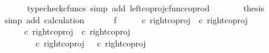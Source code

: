 \begin{isabellebody}
\ \isamarkupfalse%
\ {\isachardoublequoteopen}{\isachardot}{\kern0pt}{\isachardot}{\kern0pt}{\isachardot}{\kern0pt}\ {\isacharequal}{\kern0pt}\ {\isasymlangle}{\isasymt}{\isacharcomma}{\kern0pt}{\isasymf}{\isasymrangle}{\isachardoublequoteclose}\isanewline
\ \ \ \ \ \ \isamarkupfalse%
\ {\isacharparenleft}{\kern0pt}typecheck{\isacharunderscore}{\kern0pt}cfuncs{\isacharcomma}{\kern0pt}\ simp\ add{\isacharcolon}{\kern0pt}\ left{\isacharunderscore}{\kern0pt}coproj{\isacharunderscore}{\kern0pt}cfunc{\isacharunderscore}{\kern0pt}coprod{\isacharparenright}{\kern0pt}\isanewline
\ \ \ \ \isamarkupfalse%
\ \isamarkupfalse%
\ {\isacharquery}{\kern0pt}thesis\isanewline
\ \ \ \ \ \ \isamarkupfalse%
\ {\isacharparenleft}{\kern0pt}simp\ add{\isacharcolon}{\kern0pt}\ calculation{\isacharparenright}{\kern0pt}\isanewline
\ \ \isamarkupfalse%
\isanewline
\ \ \isamarkupfalse%
\ f{}{\isacharcolon}{\kern0pt}\ {\isachardoublequoteopen}{\isasymlangle}{\isasymt}{\isacharcomma}{\kern0pt}{\isasymt}{\isasymrangle}\ {\isasymamalg}\ {\isasymlangle}{\isasymt}{\isacharcomma}{\kern0pt}{\isasymf}{\isasymrangle}\ {\isasymamalg}\ {\isasymlangle}{\isasymf}{\isacharcomma}{\kern0pt}{\isasymt}{\isasymrangle}\ {\isasymcirc}\isactrlsub c\ {\isacharparenleft}{\kern0pt}right{\isacharunderscore}{\kern0pt}coproj\ {\isasymone}\ {\isacharparenleft}{\kern0pt}{\isasymone}{\isasymCoprod}{\isasymone}{\isacharparenright}{\kern0pt}{\isasymcirc}\isactrlsub c\ right{\isacharunderscore}{\kern0pt}coproj\ {\isasymone}\ {\isasymone}{\isacharparenright}{\kern0pt}\ {\isacharequal}{\kern0pt}\ {\isasymlangle}{\isasymf}{\isacharcomma}{\kern0pt}{\isasymt}{\isasymrangle}{\isachardoublequoteclose}\isanewline
\ \ \isamarkupfalse%
{\isacharminus}{\kern0pt}\ \isanewline
\ \ \ \ \isamarkupfalse%
\ {\isachardoublequoteopen}{\isasymlangle}{\isasymt}{\isacharcomma}{\kern0pt}{\isasymt}{\isasymrangle}\ {\isasymamalg}\ {\isasymlangle}{\isasymt}{\isacharcomma}{\kern0pt}{\isasymf}{\isasymrangle}\ {\isasymamalg}\ {\isasymlangle}{\isasymf}{\isacharcomma}{\kern0pt}{\isasymt}{\isasymrangle}\ {\isasymcirc}\isactrlsub c\ {\isacharparenleft}{\kern0pt}right{\isacharunderscore}{\kern0pt}coproj\ {\isasymone}\ {\isacharparenleft}{\kern0pt}{\isasymone}{\isasymCoprod}{\isasymone}{\isacharparenright}{\kern0pt}{\isasymcirc}\isactrlsub c\ right{\isacharunderscore}{\kern0pt}coproj\ {\isasymone}\ {\isasymone}{\isacharparenright}{\kern0pt}\ {\isacharequal}{\kern0pt}\ \isanewline
\ \ \ \ \ \ \ \ \ \ {\isacharparenleft}{\kern0pt}{\isasymlangle}{\isasymt}{\isacharcomma}{\kern0pt}{\isasymt}{\isasymrangle}\ {\isasymamalg}\ {\isasymlangle}{\isasymt}{\isacharcomma}{\kern0pt}{\isasymf}{\isasymrangle}\ {\isasymamalg}\ {\isasymlangle}{\isasymf}{\isacharcomma}{\kern0pt}{\isasymt}{\isasymrangle}\ {\isasymcirc}\isactrlsub c\ right{\isacharunderscore}{\kern0pt}coproj\ {\isasymone}\ {\isacharparenleft}{\kern0pt}{\isasymone}{\isasymCoprod}{\isasymone}{\isacharparenright}{\kern0pt}\ {\isacharparenright}{\kern0pt}{\isasymcirc}\isactrlsub c\ right{\isacharunderscore}{\kern0pt}coproj\ {\isasymone}\ {\isasymone}{\isachardoublequoteclose}\isanewline

\end{isabellebody}
